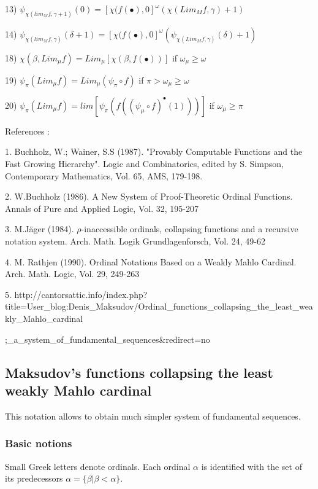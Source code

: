 \documentclass[10pt]{article}
\begin{document}
13) \( \psi_{\chi(lim_M f,\gamma+1)}(0) = [\chi(f(\bullet),0]^\omega (\chi(Lim_M f,\gamma)+1) \)

14) \( \psi_{\chi(lim_M f,\gamma)}(\delta+1) = [\chi(f(\bullet),0]^\omega (\psi_{\chi(Lim_M f,\gamma)}(\delta)+1) \)

\bigskip

18) \( \chi(\beta,Lim_\mu f) = Lim_\mu [\chi(\beta,f(\bullet))] \) if \( \omega_\mu \ge \omega \)

19) \( \psi_\pi(Lim_\mu f) = Lim_\mu (\psi_\pi \circ f) \) if \( \pi > \omega_\mu \ge \omega \)

20) \( \psi_\pi(Lim_\mu f) = lim [ \psi_\pi(f((\psi_\mu \circ f)^\bullet(1))) ] \) if \( \omega_\mu \ge \pi \)


\bigskip

References :

1. Buchholz, W.; Wainer, S.S (1987). "Provably Computable Functions and the Fast Growing Hierarchy". Logic and Combinatorics, edited by S. Simpson, Contemporary Mathematics, Vol. 65, AMS, 179-198.

2. W.Buchholz (1986). A New System of Proof-Theoretic Ordinal Functions. Annals of Pure and Applied Logic, Vol. 32, 195-207

3. M.Jäger (1984). \(\rho\)-inaccessible ordinals, collapsing functions and a recursive notation system. Arch. Math. Logik Grundlagenforsch, Vol. 24, 49-62

4. M. Rathjen (1990). Ordinal Notations Based on a Weakly Mahlo Cardinal. Arch. Math. Logic, Vol. 29, 249-263

5. http://cantorsattic.info/index.php?title=User\_blog:Denis\_Maksudov/Ordinal\_functions\_collapsing\_the\_least\_weakly\_Mahlo\_cardinal

;\_a\_system\_of\_fundamental\_sequences\&redirect=no


\subsection{Maksudov's functions collapsing the least weakly Mahlo cardinal}

This notation allows to obtain much simpler system of fundamental sequences.

\subsubsection{Basic notions}

Small Greek letters denote ordinals. Each ordinal \(\alpha\) is identified with the set of its predecessors \(\alpha=\{\beta|\beta<\alpha\}\). 
\end{document}
